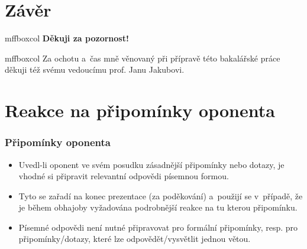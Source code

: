\documentclass[c, 10pt]{beamer}
\begin{document}
\section{Závěr}

\begin{frame}[plain]         %

\begin{beamercolorbox}[center, sep=2pt, rounded=true, shadow=true]{mffboxcol}
\LARGE\bfseries \alert{Děkuji za pozornost!}
\end{beamercolorbox}

\vspace{5em}
\begin{beamercolorbox}[center, sep=2pt, rounded=true, shadow=true]{mffboxcol}
Za ochotu a~čas mně věnovaný při přípravě této bakalářské práce děkuji též svému vedoucímu \alert{prof. Janu Jakubovi}.
\end{beamercolorbox}
\end{frame}


\section{Reakce na připomínky oponenta}

\begin{frame}\frametitle{Připomínky oponenta}

\begin{itemize}\itemsep=1ex
\item Uvedl-li oponent ve svém posudku zásadnější připomínky nebo dotazy, je vhodné 
  si připravit relevantní odpovědi písemnou formou.
\item Tyto se zařadí na konec prezentace (za poděkování) a~použijí se v~případě,
  že je během obhajoby vyžadována podrobnější reakce na tu kterou připomínku.
\item Písemné odpovědi není nutné připravovat pro formální připomínky, resp. pro
  připomínky/dotazy, které lze odpovědět/vysvětlit jednou větou.
\end{itemize}
\end{frame}
\end{document}
